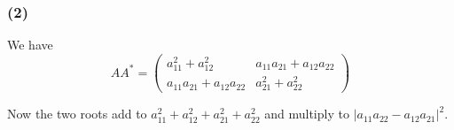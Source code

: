 \documentclass{article}
\begin{document}
\subsubsection{(2)}
We have 
\[AA^* = \left(\begin{array}{cc} a_{11}^2 + a_{12}^2 & a_{11} a_{21} + a_{12} a_{22} \\ a_{11} a_{21} + a_{12} a_{22} & a_{21}^2 + a_{22}^2 \end{array}\right) \]

Now the two roots add to $a_{11}^2 + a_{12}^2 + a_{21}^2 + a_{22}^2$ and multiply to $|a_{11} a_{22} - a_{12} a_{21}|^2$. 
\end{document}
